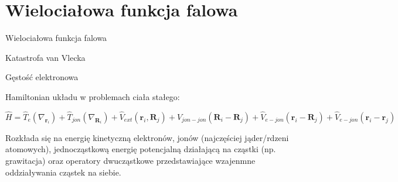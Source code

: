 \section{Wielociałowa funkcja falowa}

Wielociałowa funkcja falowa

Katastrofa van Vlecka

Gęstość elektronowa

Hamiltonian układu w problemach ciała stałego:

\[
\hat{H}=\hat{T}_{e}\left(\nabla_{\boldsymbol{r}_{i}}\right)+\hat{T}_{jon}\left(\nabla_{\boldsymbol{R}_{i}}\right)+\hat{V}_{ext}\left(\boldsymbol{r}_{i},\boldsymbol{R}_{j}\right)+\hat{V}_{jon-jon}\left(\boldsymbol{R}_{i}-\boldsymbol{R}_{j}\right)+\hat{V}_{e-jon}\left(\boldsymbol{r}_{i}-\boldsymbol{R}_{j}\right)+\hat{V}_{e-jon}\left(\boldsymbol{r}_{i}-\boldsymbol{r}_{j}\right)
\]


Rozkłada się na energię kinetyczną elektronów, jonów (najczęściej
jąder/rdzeni atomowych), jednocząstkową energię potencjalną działającą
na cząstki (np. grawitacja) oraz operatory dwucząstkowe przedstawiające
wzajenmne oddziaływania cząstek na siebie.

